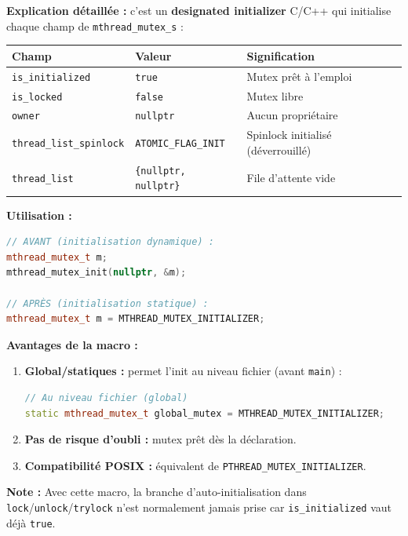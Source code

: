 \documentclass[11pt,a4paper]{article}
\let\oldtexttt\texttt
\renewcommand{\texttt}[1]{\oldtexttt{\color{keyword}#1}}
\begin{document}
\textbf{Explication détaillée :} c'est un \textbf{designated initializer} C/C++ qui initialise chaque champ de \texttt{mthread\_mutex\_s} :

\begin{center}
\begin{tabular}{|l|l|l|}
\hline
\textbf{Champ} & \textbf{Valeur} & \textbf{Signification} \\
\hline
\texttt{is\_initialized} & \texttt{true} & Mutex prêt à l'emploi \\
\hline
\texttt{is\_locked} & \texttt{false} & Mutex libre \\
\hline
\texttt{owner} & \texttt{nullptr} & Aucun propriétaire \\
\hline
\texttt{thread\_list\_spinlock} & \texttt{ATOMIC\_FLAG\_INIT} & Spinlock initialisé (déverrouillé) \\
\hline
\texttt{thread\_list} & \texttt{\{nullptr, nullptr\}} & File d'attente vide \\
\hline
\end{tabular}
\end{center}

\textbf{Utilisation :}
\begin{lstlisting}[language=C++]
// AVANT (initialisation dynamique) :
mthread_mutex_t m;
mthread_mutex_init(nullptr, &m);

// APRÈS (initialisation statique) :
mthread_mutex_t m = MTHREAD_MUTEX_INITIALIZER;
\end{lstlisting}

\textbf{Avantages de la macro :}
\begin{enumerate}
  \item \textbf{Global/statiques :} permet l'init au niveau fichier (avant \texttt{main}) :
\begin{lstlisting}[language=C++]
// Au niveau fichier (global)
static mthread_mutex_t global_mutex = MTHREAD_MUTEX_INITIALIZER;
\end{lstlisting}
  \item \textbf{Pas de risque d'oubli :} mutex prêt dès la déclaration.
  \item \textbf{Compatibilité POSIX :} équivalent de \texttt{PTHREAD\_MUTEX\_INITIALIZER}.
\end{enumerate}

\textbf{Note :} Avec cette macro, la branche d'auto-initialisation dans \texttt{lock}/\texttt{unlock}/\texttt{trylock} n'est normalement jamais prise car \texttt{is\_initialized} vaut déjà \texttt{true}.
\end{document}
